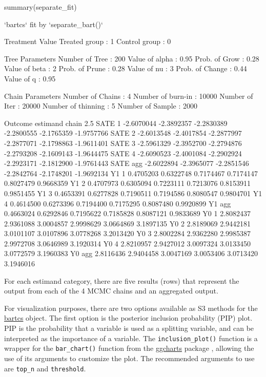 \begin{example}
summary(separate_fit)

`bartcs` fit by `separate_bart()`

Treatment Value
  Treated group    :      1
  Control group    :      0

Tree Parameters
  Number of Tree   :    200		Value  of alpha    :   0.95
  Prob.  of Grow   :   0.28		Value  of beta     :      2
  Prob.  of Prune  :   0.28		Value  of nu       :      3
  Prob.  of Change :   0.44		Value  of q        :   0.95

Chain Parameters
  Number of Chains :      4		Number of burn-in  :  10000
  Number of Iter   :  20000		Number of thinning :      5
  Number of Sample :   2000

Outcome
 estimand chain       2.5%
     SATE     1 -2.6070044 -2.3892357 -2.2830389 -2.2800555 -2.1765359 -1.9757766
     SATE     2 -2.6013548 -2.4017854 -2.2877997 -2.2877071 -2.1798863 -1.9611401
     SATE     3 -2.5961329 -2.3952700 -2.2794876 -2.2793208 -2.1609143 -1.9644475
     SATE     4 -2.6090523 -2.4001084 -2.2902924 -2.2923171 -2.1812900 -1.9761443
     SATE   agg -2.6022894 -2.3965077 -2.2851546 -2.2842764 -2.1748201 -1.9692134
       Y1     1  0.4705203  0.6322748  0.7174467  0.7174147  0.8027479  0.9668359
       Y1     2  0.4707973  0.6305094  0.7223111  0.7213076  0.8153911  0.9851455
       Y1     3  0.4653391  0.6277828  0.7190511  0.7194586  0.8080547  0.9804701
       Y1     4  0.4614500  0.6273396  0.7194400  0.7175295  0.8087480  0.9920899
       Y1   agg  0.4663024  0.6292846  0.7195622  0.7185828  0.8087121  0.9833689
       Y0     1  2.8082437  2.9361088  3.0004857  2.9998629  3.0664869  3.1897135
       Y0     2  2.8189069  2.9442181  3.0101107  3.0107896  3.0778268  3.2013420
       Y0     3  2.8002284  2.9362280  2.9985387  2.9972708  3.0646989  3.1920314
       Y0     4  2.8210957  2.9427012  3.0097324  3.0133450  3.0772579  3.1960383
       Y0   agg  2.8116436  2.9404458  3.0047169  3.0053406  3.0713420  3.1946016
\end{example}
For each estimand category, there are five results (rows) that represent the output from each of the 4 MCMC chains and an aggregated output.

For visualization purposes, there are two options available as S3 methods for the \href{https://CRAN.R-project.org/package=bartcs}{bartcs} object. The first option is the posterior inclusion probability (PIP) plot. PIP is the probability that a variable is used as a splitting variable, and can be interpreted as the importance of a variable. The \verb|inclusion_plot()| function is a wrapper for the \verb|bar_chart()| function from the \href{https://cran.r-project.org/package=ggcharts}{ggcharts} package \citep{ggcharts}, allowing the use of its arguments to customize the plot. The recommended arguments to use are \verb|top_n| and \verb|threshold|.

